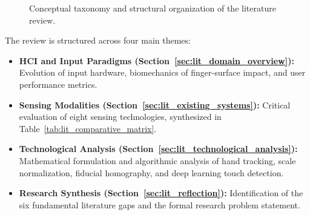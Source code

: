 \begin{figure}[htbp]
{%
}
\caption{Conceptual taxonomy and structural organization of the literature review.}
\label{fig:lit_conceptual_map_diagram}
\end{figure}

The review is structured across four main themes:
\begin{itemize}
    \item \textbf{HCI and Input Paradigms (Section~\ref{sec:lit_domain_overview}):} Evolution of input hardware, biomechanics of finger-surface impact, and user performance metrics.
    \item \textbf{Sensing Modalities (Section~\ref{sec:lit_existing_systems}):} Critical evaluation of eight sensing technologies, synthesized in Table~\ref{tab:lit_comparative_matrix}.
    \item \textbf{Technological Analysis (Section~\ref{sec:lit_technological_analysis}):} Mathematical formulation and algorithmic analysis of hand tracking, scale normalization, fiducial homography, and deep learning touch detection.
    \item \textbf{Research Synthesis (Section~\ref{sec:lit_reflection}):} Identification of the six fundamental literature gaps and the formal research problem statement.
\end{itemize}

